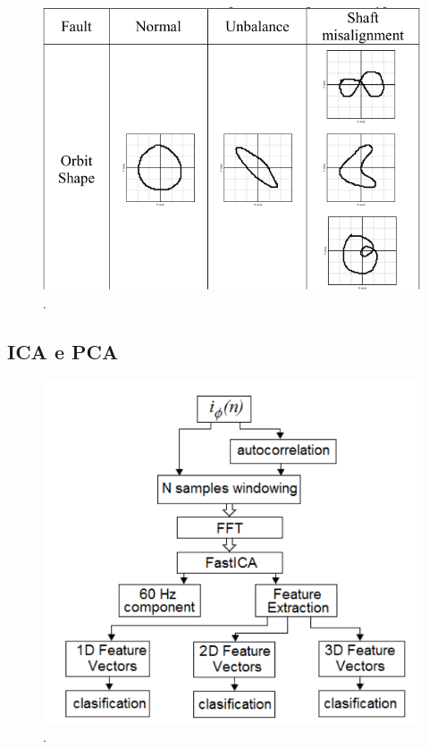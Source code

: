 \begin{figure}[H]
    \caption{.}
    \begin{center}
        \includegraphics[scale=.45]{referencial/img/orbit_jeong_p3.png}
    \end{center}
    \label{fig:}
\end{figure}


% 

\subsection{ICA e PCA}

\begin{figure}[H]
    \caption{.}
    \begin{center}
        \includegraphics[scale=.5]{referencial/img/ica_bracamonte_p4.png}
    \end{center}
    \label{fig:}
\end{figure}